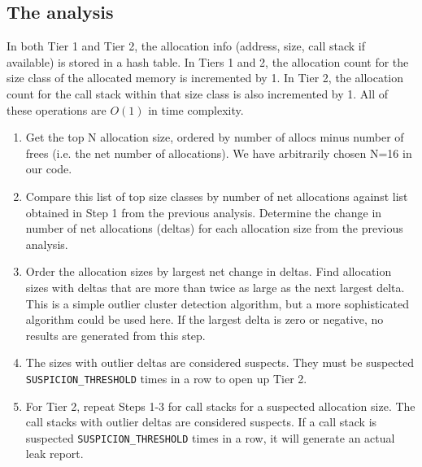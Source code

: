 \documentclass[preprint, numbers]{sigplanconf}
\newcommand{\comment}[1]{{\color{blue}{#1}}}
\begin{document}
\subsection{The analysis}

\comment{
Describe what is the complexity of record operations in tier 1 and 2
(respectively arrays and hash arrays), hash map for GetSize(p).
Mention about the analysis phase -- $O(\log n)$ complexity
for getting candidates with the highest count.
Maybe add pseudocode for Analysis().}

In both Tier 1 and Tier 2, the allocation info (address, size, call stack if available) is stored in a hash table. In Tiers 1 and 2, the allocation count for the size class of the allocated memory is incremented by 1. In Tier 2, the allocation count for the call stack within that size class is also incremented by 1.
All of these operations are $O(1)$ in time complexity.

\begin{enumerate}
\item Get the top N allocation size, ordered by number of allocs minus number of frees (i.e. the net number of allocations). We have arbitrarily chosen N=16 in our code.

\item Compare this list of top size classes by number of net allocations against list obtained in Step 1 from the previous analysis. Determine the change in number of net allocations (deltas) for each allocation size from the previous analysis.

\item Order the allocation sizes by largest net change in deltas. Find allocation sizes with deltas that are more than twice as large as the next largest delta. This is a simple outlier cluster detection algorithm, but a more sophisticated algorithm could be used here. If the largest delta is zero or negative, no results are generated from this step.

\item The sizes with outlier deltas are considered suspects. They must be suspected \texttt{SUSPICION\_THRESHOLD} times in a row to open up Tier 2.

\item For Tier 2, repeat Steps 1-3 for call stacks for a suspected allocation size. The call stacks with outlier deltas are considered suspects. If a call stack is suspected \texttt{SUSPICION\_THRESHOLD} times in a row, it will generate an actual leak report.
\end{enumerate}
\end{document}
